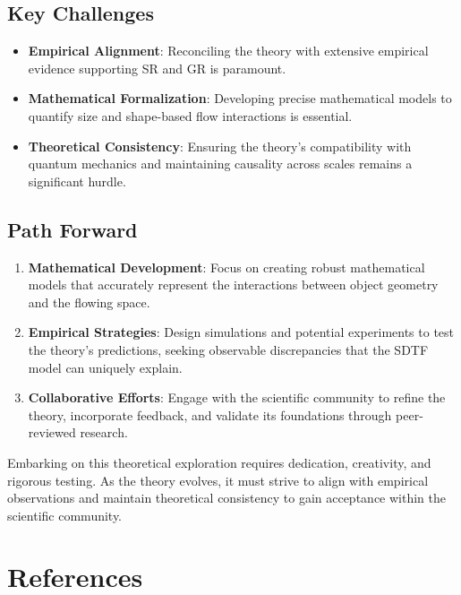 \documentclass[12pt]{article}
\begin{document}
\subsection{Key Challenges}
\begin{itemize}
    \item \textbf{Empirical Alignment}: Reconciling the theory with extensive empirical evidence supporting SR and GR is paramount.
    \item \textbf{Mathematical Formalization}: Developing precise mathematical models to quantify size and shape-based flow interactions is essential.
    \item \textbf{Theoretical Consistency}: Ensuring the theory's compatibility with quantum mechanics and maintaining causality across scales remains a significant hurdle.
\end{itemize}

\subsection{Path Forward}
\begin{enumerate}
    \item \textbf{Mathematical Development}: Focus on creating robust mathematical models that accurately represent the interactions between object geometry and the flowing space.
    \item \textbf{Empirical Strategies}: Design simulations and potential experiments to test the theory's predictions, seeking observable discrepancies that the SDTF model can uniquely explain.
    \item \textbf{Collaborative Efforts}: Engage with the scientific community to refine the theory, incorporate feedback, and validate its foundations through peer-reviewed research.
\end{enumerate}

Embarking on this theoretical exploration requires dedication, creativity, and rigorous testing. As the theory evolves, it must strive to align with empirical observations and maintain theoretical consistency to gain acceptance within the scientific community.

\section*{References}
\end{document}
